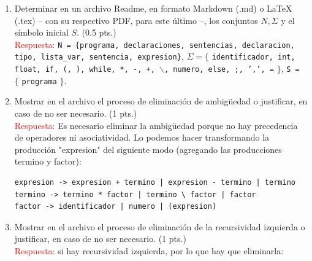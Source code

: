 \documentclass[11pt]{report}
\begin{document}
\begin{enumerate}
\item Determinar en un archivo Readme, en formato Markdown (.md) o LaTeX (.tex) -- con su
  respectivo PDF, para este último --, los conjuntos $N, \Sigma$ y el símbolo inicial $S$.
    (0.5 pts.) \\
    \textcolor{red}{Respuesta:} \texttt{N = \{programa, declaraciones, sentencias, declaracion,
    tipo, lista\_var, sentencia, expresion\}}, $\Sigma = \{$ \texttt{identificador, int, float,
    if, (, ), while, *, -, +, $\backslash$, numero, else, ;, ',', =} $\}$, \texttt{S = } $\{$
    \texttt{programa} $\}$.
\item Mostrar en el archivo el proceso de eliminación de ambigüedad o justificar, en caso
  de no ser necesario. (1 pts.) \\
    \textcolor{red}{Respuesta:} Es necesario eliminar la ambigüedad porque no hay precedencia
    de operadores ni asociatividad. Lo podemos hacer transformando la producción "expresion"
    del siguiente modo (agregando las producciones termino y factor):
    \begin{verbatim}
expresion -> expresion + termino | expresion - termino | termino
termino -> termino * factor | termino \ factor | factor
factor -> identificador | numero | (expresion)
    \end{verbatim}
\item Mostrar en el archivo el proceso de eliminación de la recursividad izquierda o
  justificar, en caso de no ser necesario. (1 pts.) \\
  \textcolor{red}{Respuesta:} si hay recursividad izquierda, por lo que hay que eliminarla: \\


\end{enumerate}
\end{document}
